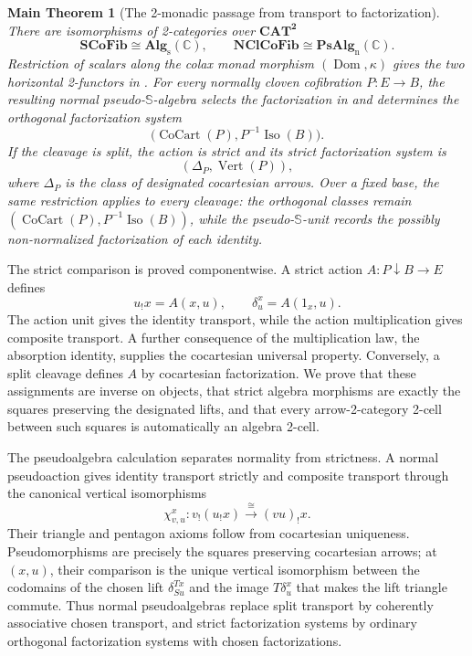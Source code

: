 \documentclass[11pt]{article}
\theoremstyle{plain}
\newtheorem*{maintheorem}{Main Theorem}
\theoremstyle{definition}
\theoremstyle{remark}
\newcommand{\CAT}{\mathbf{CAT}}
\newcommand{\SCoFib}{\mathbf{SCoFib}}
\newcommand{\NClCoFib}{\mathbf{NClCoFib}}
\newcommand{\Alg}{\mathbf{Alg}_{\mathrm{s}}}
\newcommand{\PsAlg}{\mathbf{PsAlg}}
\newcommand{\CoCart}{\operatorname{CoCart}}
\newcommand{\Vrt}{\operatorname{Vert}}
\newcommand{\Iso}{\operatorname{Iso}}
\newcommand{\Dom}{\operatorname{Dom}}
\newcommand{\C}{\mathbb{C}}
\newcommand{\Sq}{\mathbb{S}}
\numberwithin{equation}{section}
\begin{document}
\begin{maintheorem}[The 2-monadic passage from transport to
factorization]
There are isomorphisms of 2-categories over $\CAT^{\mathbf 2}$
\begin{equation*}
  \SCoFib\cong\Alg(\C),
  \qquad
  \NClCoFib\cong\PsAlg_{\mathrm n}(\C).
\end{equation*}
Restriction of scalars along the colax monad morphism
$(\Dom,\kappa)$ gives the two horizontal
2-functors in .  For every normally cloven
cofibration $P\colon E\to B$, the resulting normal pseudo-$\Sq$-algebra
selects the factorization in  and determines
the orthogonal factorization system
\begin{equation*}
  \bigl(\CoCart(P),P^{-1}\Iso(B)\bigr).
\end{equation*}
If the cleavage is split, the action is strict and its strict
factorization system is
\begin{equation*}
  (\Delta_P,\Vrt(P)),
\end{equation*}
where $\Delta_P$ is the class of designated cocartesian arrows.
Over a fixed base, the same restriction applies to every cleavage: the
orthogonal classes remain
$(\CoCart(P),P^{-1}\Iso(B))$, while the pseudo-$\Sq$-unit records the
possibly non-normalized factorization of each identity.
\end{maintheorem}

The strict comparison is proved componentwise.  A strict action
$A\colon P\!\downarrow\!B\to E$ defines
\begin{equation*}
  u_!x=A(x,u),
  \qquad
  \delta^x_u=A(1_x,u).
\end{equation*}
The action unit gives the identity transport, while the action
multiplication gives composite transport.  A further consequence of the
multiplication law, the absorption identity, supplies the cocartesian
universal property.  Conversely, a split cleavage defines $A$ by
cocartesian factorization.  We prove that these assignments are inverse
on objects, that strict algebra morphisms are exactly the squares
preserving the designated lifts, and that every arrow-2-category 2-cell
between such squares is automatically an algebra 2-cell.

The pseudoalgebra calculation separates normality from strictness.  A
normal pseudoaction gives identity transport strictly and composite
transport through the canonical vertical isomorphisms
\begin{equation*}
  \chi^x_{v,u}\colon v_!(u_!x)\xrightarrow{\ \cong\ }(vu)_!x.
\end{equation*}
Their triangle and pentagon axioms follow from cocartesian uniqueness.
Pseudomorphisms are precisely the squares preserving cocartesian arrows;
at $(x,u)$, their comparison is the unique vertical isomorphism between
the codomains of the chosen lift $\delta^{Tx}_{Su}$ and the image
$T\delta^x_u$ that makes the lift triangle commute.  Thus normal
pseudoalgebras replace split transport by
coherently associative chosen transport, and strict factorization
systems by ordinary orthogonal factorization systems with chosen
factorizations.
\end{document}
